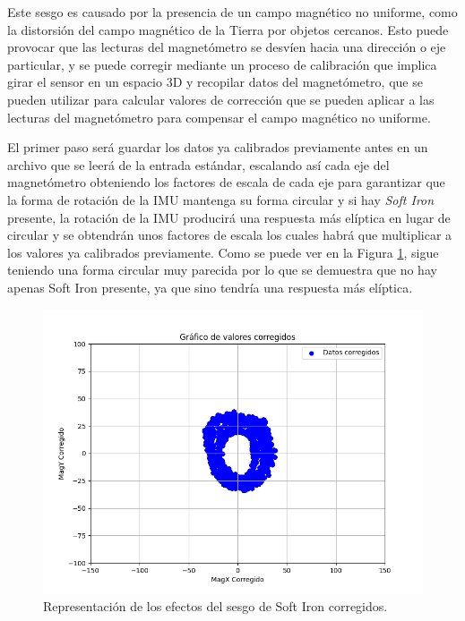 Este sesgo es causado por la presencia de un campo magnético no uniforme, como la distorsión del campo magnético de la Tierra por objetos cercanos. Esto puede provocar que las lecturas del magnetómetro se desvíen hacia una dirección o eje particular, y se puede corregir mediante un proceso de calibración que implica girar el sensor en un espacio 3D y recopilar datos del magnetómetro, que se pueden utilizar para calcular valores de corrección que se pueden aplicar a las lecturas del magnetómetro para compensar el campo magnético no uniforme.

El primer paso será guardar los datos ya calibrados previamente antes en un archivo que se leerá de la entrada estándar, escalando así cada eje del magnetómetro obteniendo los factores de escala de cada eje para garantizar que la forma de rotación de la IMU mantenga su forma circular y si hay \textit{Soft Iron} presente, la rotación de la IMU producirá una respuesta más elíptica en lugar de circular y se obtendrán unos factores de escala los cuales habrá que multiplicar a los valores ya calibrados previamente. Como se puede ver en la Figura \ref{fig:softiron}, sigue teniendo una forma circular muy parecida por lo que se demuestra que no hay apenas Soft Iron presente, ya que sino tendría una respuesta más elíptica.

\begin{figure}[H]
  \centering
  \includegraphics[scale=0.6]{figs/soft_iron_calibration} %
  \caption{ Representación de los efectos del sesgo de Soft Iron corregidos.}
  \label{fig:softiron}
\end{figure} 

